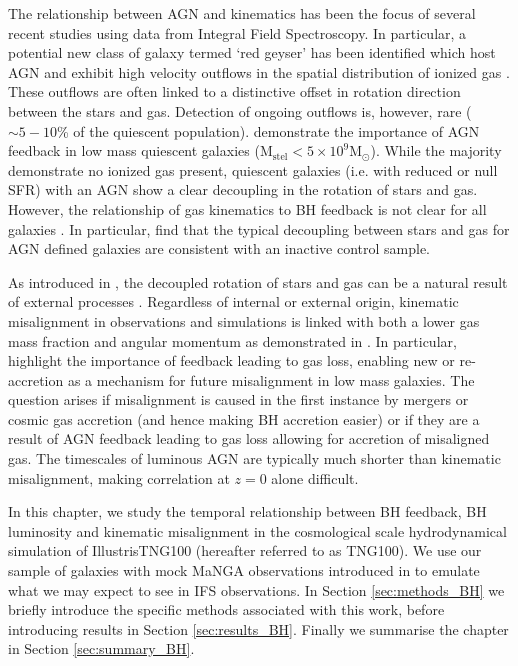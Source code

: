 The relationship between AGN and kinematics has been the focus of several recent studies using data from Integral Field Spectroscopy. In particular, a potential new class of galaxy termed `red geyser' has been identified which host AGN and exhibit high velocity outflows in the spatial distribution of ionized gas \citep[][]{cheung2016, roy2018}. These outflows are often linked to a distinctive offset in rotation direction between the stars and gas. Detection of ongoing outflows is, however, rare ($\sim5-10$\% of the quiescent population). \citet{penny2018} demonstrate the importance of AGN feedback in low mass quiescent galaxies ($\mathrm{M_{stel} < 5 \times 10^{9}M_{\odot}}$). While the majority demonstrate no ionized gas present, quiescent galaxies (i.e. with reduced or null SFR) with an AGN show a clear decoupling in the rotation of stars and gas. However, the relationship of gas kinematics to BH feedback is not clear for all galaxies \citep[see also:][]{koudmani2019}. In particular, \citet{ilha2019} find that the typical decoupling between stars and gas for AGN defined galaxies are consistent with an inactive control sample. 

As introduced in , the decoupled rotation of stars and gas can be a natural result of external processes \cite[e.g.][]{davis2011, barrera2015, vdvoort2015, jin2016, bryant2019, duckworth2019_halo, li_decoupling2019}. Regardless of internal or external origin, kinematic misalignment in observations and simulations is linked with both a lower gas mass fraction and angular momentum as demonstrated in  \citep[see also;][]{starkenburg+19, khim2019}. In particular, \citet{starkenburg+19} highlight the importance of feedback leading to gas loss, enabling new or re-accretion as a mechanism for future misalignment in low mass galaxies. The question arises if misalignment is caused in the first instance by mergers or cosmic gas accretion (and hence making BH accretion easier) or if they are a result of AGN feedback leading to gas loss allowing for accretion of misaligned gas. The timescales of luminous AGN are typically much shorter than kinematic misalignment, making correlation at $z=0$ alone difficult. 

In this chapter, we study the temporal relationship between BH feedback, BH luminosity and kinematic misalignment in the cosmological scale hydrodynamical simulation of IllustrisTNG100 (hereafter referred to as TNG100). We use our sample of galaxies with mock MaNGA observations introduced in  to emulate what we may expect to see in IFS observations. In Section \ref{sec:methods_BH} we briefly introduce the specific methods associated with this work, before introducing results in Section \ref{sec:results_BH}. Finally we summarise the chapter in Section \ref{sec:summary_BH}.

